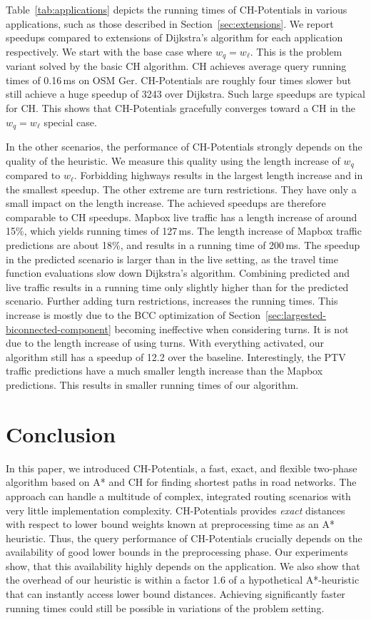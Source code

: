 \documentclass[a4paper,UKenglish,cleveref, autoref, thm-restate]{lipics-v2021}
\begin{document}
Table~\ref{tab:applications} depicts the running times of CH-Potentials in various applications, such as those described in Section~\ref{sec:extensions}.
We report speedups compared to extensions of Dijkstra's algorithm for each application respectively.
We start with the base case where $w_q = w_\ell$.
This is the problem variant solved by the basic CH algorithm.
CH achieves average query running times of 0.16\,ms on OSM Ger.
CH-Potentials are roughly four times slower but still achieve a huge speedup of 3243 over Dijkstra.
Such large speedups are typical for CH.
This shows that CH-Potentials gracefully converges toward a CH in the $w_q = w_\ell$ special case.

In the other scenarios, the performance of CH-Potentials strongly depends on the quality of the heuristic.
We measure this quality using the length increase of $w_q$ compared to $w_\ell$.
Forbidding highways results in the largest length increase and in the smallest speedup.
The other extreme are turn restrictions.
They have only a small impact on the length increase.
The achieved speedups are therefore comparable to CH speedups.
%
Mapbox live traffic has a length increase of around 15\%, which yields running times of 127\,ms.
The length increase of Mapbox traffic predictions are about 18\%, and results in a running time of 200\,ms.
The speedup in the predicted scenario is larger than in the live setting, as the travel time function evaluations slow down Dijkstra's algorithm.
Combining predicted and live traffic results in a running time only slightly higher than for the predicted scenario.
Further adding turn restrictions, increases the running times.
This increase is mostly due to the BCC optimization of Section~\ref{sec:largested-biconnected-component} becoming ineffective when considering turns.
It is not due to the length increase of using turns.
With everything activated, our algorithm still has a speedup of 12.2 over the baseline.
Interestingly, the PTV traffic predictions have a much smaller length increase than the Mapbox predictions.
This results in smaller running times of our algorithm.

\section{Conclusion}
\label{sec:conclusion}

In this paper, we introduced CH-Potentials, a fast, exact, and flexible two-phase algorithm based on A* and CH for finding shortest paths in road networks.
The approach can handle a multitude of complex, integrated routing scenarios with very little implementation complexity.
CH-Potentials provides \emph{exact} distances with respect to lower bound weights known at preprocessing time as an A* heuristic.
Thus, the query performance of CH-Potentials crucially depends on the availability of good lower bounds in the preprocessing phase.
Our experiments show, that this availability highly depends on the application.
We also show that the overhead of our heuristic is within a factor 1.6 of a hypothetical A*-heuristic that can instantly access lower bound distances.
Achieving significantly faster running times could still be possible in variations of the problem setting.
\end{document}

